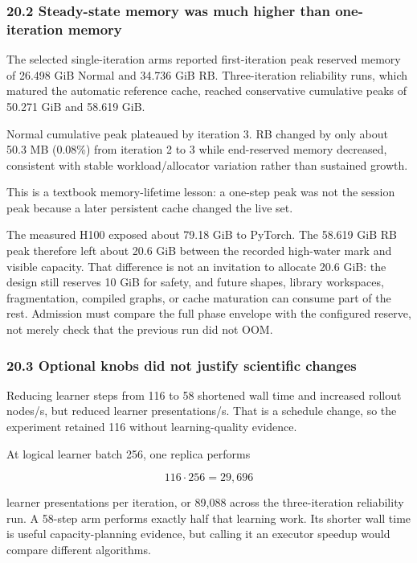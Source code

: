 \documentclass[
  10pt,
  letterpaper,
]{article}
\begin{document}
\subsubsection{20.2 Steady-state memory was much higher than
one-iteration
memory}\label{202-steady-state-memory-was-much-higher-than-one-iteration-memory}

The selected single-iteration arms reported first-iteration peak
reserved memory of 26.498 GiB Normal and 34.736 GiB RB. Three-iteration
reliability runs, which matured the automatic reference cache, reached
conservative cumulative peaks of 50.271 GiB and 58.619 GiB.

Normal cumulative peak plateaued by iteration 3. RB changed by only
about 50.3 MB (0.08\%) from iteration 2 to 3 while end-reserved memory
decreased, consistent with stable workload/allocator variation rather
than sustained growth.

This is a textbook memory-lifetime lesson: a one-step peak was not the
session peak because a later persistent cache changed the live set.

The measured H100 exposed about 79.18 GiB to PyTorch. The 58.619 GiB RB
peak therefore left about 20.6 GiB between the recorded high-water mark
and visible capacity. That difference is not an invitation to allocate
20.6 GiB: the design still reserves 10 GiB for safety, and future
shapes, library workspaces, fragmentation, compiled graphs, or cache
maturation can consume part of the rest. Admission must compare the full
phase envelope with the configured reserve, not merely check that the
previous run did not OOM.

\subsubsection{20.3 Optional knobs did not justify scientific
changes}\label{203-optional-knobs-did-not-justify-scientific-changes}

Reducing learner steps from 116 to 58 shortened wall time and increased
rollout nodes/s, but reduced learner presentations/s. That is a schedule
change, so the experiment retained 116 without learning-quality
evidence.

At logical learner batch 256, one replica performs

\[
116\cdot256=29,696
\]

learner presentations per iteration, or 89,088 across the
three-iteration reliability run. A 58-step arm performs exactly half
that learning work. Its shorter wall time is useful capacity-planning
evidence, but calling it an executor speedup would compare different
algorithms.
\end{document}
